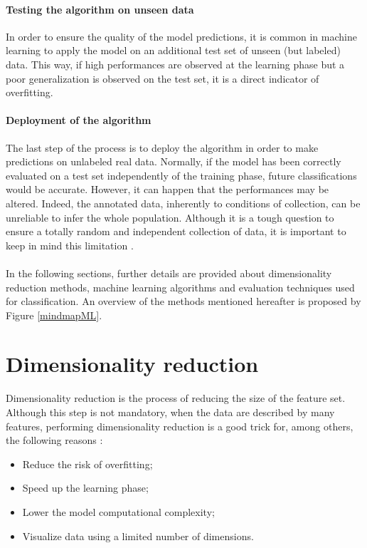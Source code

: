 \documentclass[a4paper,10pt]{article}
\begin{document}
\paragraph{Testing the algorithm on unseen data}
In order to ensure the quality of the model predictions, it is common in machine learning to apply the model on an additional test set of unseen (but labeled) data. This way, if high performances are observed at the learning phase but a poor generalization is observed on the test set, it is a direct indicator of overfitting.

\paragraph{Deployment of the algorithm}
The last step of the process is to deploy the algorithm in order to make predictions on unlabeled real data. Normally, if the model has been correctly evaluated on a test set independently of the training phase, future classifications would be accurate. However, it can happen that the performances may be altered. Indeed, the annotated data, inherently to conditions of collection, can be unreliable to infer the whole population. Although it is a tough question to ensure a totally random and independent collection of data, it is important to keep in mind this limitation \cite{mitData}.
\\
\\
In the following sections, further details are provided about dimensionality reduction methods, machine learning algorithms and evaluation techniques used for classification. An overview of the methods mentioned hereafter is proposed by Figure \ref{mindmapML}.

\section{Dimensionality reduction}
\label{dimension} 

Dimensionality reduction is the process of reducing the size of the feature set. Although this step is not mandatory, when the data are described by many features, performing dimensionality reduction is a good trick for, among others, the following reasons \cite{coelho2015building}:
\begin{itemize}
\item Reduce the risk of overfitting;
\item Speed up the learning phase;
\item Lower the model computational complexity;
\item Visualize data using a limited number of dimensions.
\end{itemize}
\end{document}
